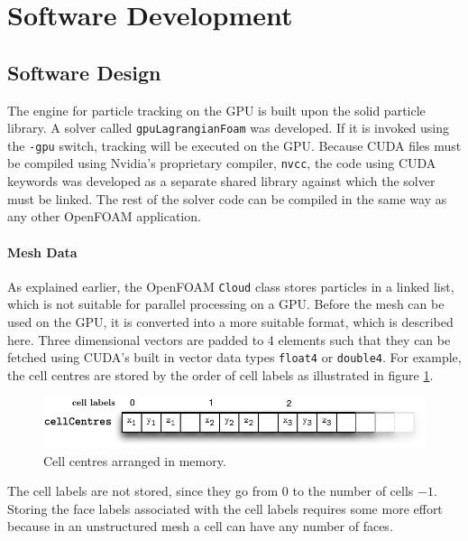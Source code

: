 \section{Software Development}

\label{sec:coding}

\subsection{Software Design}

The engine for particle tracking on the GPU is built upon the solid particle library. A solver called \verb+gpuLagrangianFoam+ was developed. If it is invoked using the \verb+-gpu+ switch, tracking will be executed on the GPU. Because CUDA files must be compiled using Nvidia's proprietary compiler, \verb+nvcc+, the code using CUDA keywords was developed as a separate shared library against which the solver must be linked. The rest of the solver code can be compiled in the same way as any other OpenFOAM application.

\paragraph{Mesh Data}

As explained earlier, the OpenFOAM \verb+Cloud+ class stores particles in a linked list, which is not suitable for parallel processing on a GPU. Before the mesh can be used on the GPU, it is converted into a more suitable format, which is described here. Three dimensional vectors are padded to 4 elements such that they can be fetched using CUDA's built in vector data types \verb+float4+ or \verb+double4+. For example, the cell centres are stored by the order of cell labels as illustrated in figure \ref{gfx:cellCentres}.

\begin{figure}[H]
  \centering
  \includegraphics[scale=0.8]{content/gfx/cellCentres.pdf}
  \caption{Cell centres arranged in memory.}
  \label{gfx:cellCentres}
\end{figure}

The cell labels are not stored, since they go from $0$ to the number of cells $- 1$. Storing the face labels associated with the cell labels requires some more effort because in an unstructured mesh a cell can have any number of faces. 

